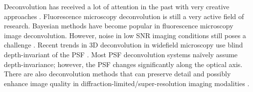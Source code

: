 \begin{definition}
	Deconvolution has received a lot of attention in the past with very creative approaches \citep{Mukamel2012,Verveer2007,Periasamy1999,Swedlow2007,Rooi2014}.
	Fluorescence microscopy deconvolution is still a very active field of research.
	Bayesian methods have become popular in fluorescence microscopy image deconvolution. 
	However, noise in low SNR imaging conditions still poses a challenge \citep{Wong2015}.
	Recent trends in 3D deconvolution in widefield microscopy use blind depth-invariant of the PSF \citep{Kim2015}.
	Most PSF deconvolution systems na{\"i}vely assume depth-invariance; however, the PSF changes significantly along the optical axis.
	There are also deconvolution methods that can preserve detail and possibly enhance image quality in diffraction-limited/super-resolution imaging modalities \citep{Qin2016}.
\end{definition}

